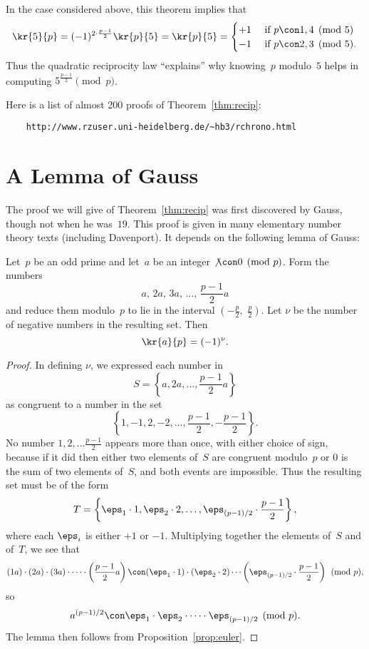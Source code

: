 \documentclass[11pt]{report}
\begin{document}
In the case considered above, this theorem implies that
$$
  \kr{5}{p} = (-1)^{2\cdot \frac{p-1}{2}} \kr{p}{5}
  =\kr{p}{5}
  = \begin{cases} +1 & \text{ if }p\con 1, 4\pmod{5}  \\
              -1 & \text{ if }p\con 2, 3\pmod{5}.
  \end{cases}
$$
Thus the quadratic reciprocity law ``explains'' why knowing~$p$ modulo~$5$
helps in computing $5^{\frac{p-1}{2}}\pmod{p}$.

Here is a list of almost 200 proofs of Theorem~\ref{thm:recip}:
\begin{verbatim}
    http://www.rzuser.uni-heidelberg.de/~hb3/rchrono.html
\end{verbatim}

\section{A Lemma of Gauss}
The proof we will give of Theorem~\ref{thm:recip} was first discovered
by Gauss, though not when he was~$19$.  This proof is given in many
elementary number theory texts (including Davenport).  It depends on
the following lemma of Gauss:

\begin{lemma}
  Let~$p$ be an odd prime and let~$a$ be an integer $\not\con 0\pmod{p}$.
  Form the numbers
  $$
    a,\, 2a,\, 3a,\, \ldots,\, \frac{p-1}{2} a
  $$
  and reduce them modulo~$p$ to lie in the interval
  $(-\frac{p}{2},\,\, \frac{p}{2})$.
  Let $\nu$ be the number of negative numbers in the resulting set.
  Then
  $$
    \kr{a}{p} = (-1)^{\nu}.
  $$
\end{lemma}
\begin{proof}
  In defining $\nu$, we expressed each number in
  $$
    S = \left\{a, 2a, \ldots, \frac{p-1}{2} a\right\}
  $$
  as congruent to a number in the set
  $$
    \left\{ 1, -1, 2, -2, \ldots, \frac{p-1}{2}, -\frac{p-1}{2}\right\}.
  $$
  No number
  $1, 2, \ldots \frac{p-1}{2}$
  appears more than once, with either choice of sign, because if it
  did then either two elements of~$S$ are congruent modulo~$p$ or
  $0$ is the sum of two elements of~$S$, and both events are impossible.
  Thus the resulting set must be of the form
  $$T = \left\{\eps_1\cdot 1, \eps_2 \cdot 2, \ldots,
    \eps_{(p-1)/2}\cdot \frac{p-1}{2} \right\},$$
  where each $\eps_i$ is either $+1$ or $-1$.  Multiplying together
  the elements of~$S$ and of~$T$, we see that
  $$
    (1a) \cdot (2a)\cdot(3a)\cdot \cdots \cdot  \left(\frac{p-1}{2} a\right)
    \con
    (\eps_1\cdot 1)\cdot (\eps_2 \cdot 2) \cdots
    \left(\eps_{(p-1)/2}  \cdot \frac{p-1}{2}\right)\pmod{p},
  $$
  so
  $$
    a^{(p-1)/2} \con \eps_1\cdot \eps_2\cdot \cdots \cdot \eps_{(p-1)/2}\pmod{p}.$$
  The lemma then follows from Proposition~\ref{prop:euler}.
\end{proof}
\end{document}
